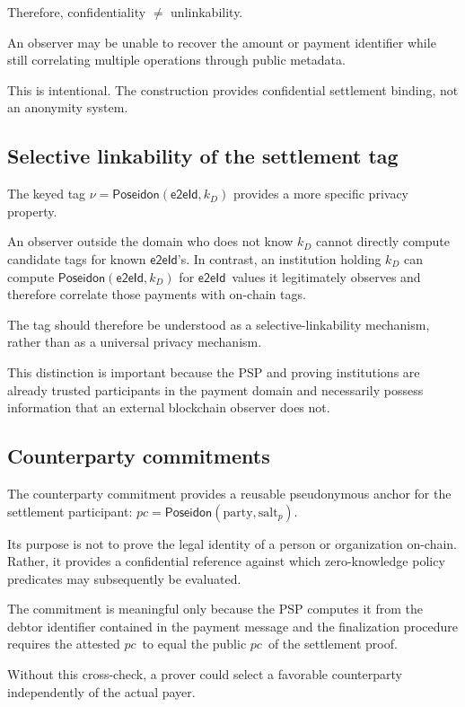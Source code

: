 \documentclass[10pt,twocolumn]{article}
\newcommand{\Poseidon}{\ensuremath{\mathsf{Poseidon}}}
\newcommand{\eeid}{\ensuremath{\mathsf{e2eId}}}
\newcommand{\party}{\ensuremath{\text{party}}}
\newcommand{\salt}{\ensuremath{\text{salt}}}
\newcommand{\pc}{\ensuremath{\mathit{pc}}}
\begin{document}
Therefore, confidentiality $\neq$ unlinkability.

An observer may be unable to recover the amount or payment identifier
while still correlating multiple operations through public metadata.

This is intentional. The construction provides confidential settlement
binding, not an anonymity system.

\subsection{Selective linkability of the settlement tag}

The keyed tag $\nu=\Poseidon(\eeid,k_D)$ provides a more specific privacy
property.

An observer outside the domain who does not know $k_D$ cannot directly
compute candidate tags for known \eeid's. In contrast, an institution
holding $k_D$ can compute $\Poseidon(\eeid,k_D)$ for \eeid\ values it
legitimately observes and therefore correlate those payments with
on-chain tags.

The tag should therefore be understood as a selective-linkability
mechanism, rather than as a universal privacy mechanism.

This distinction is important because the PSP and proving institutions
are already trusted participants in the payment domain and necessarily
possess information that an external blockchain observer does not.

\subsection{Counterparty commitments}

The counterparty commitment provides a reusable pseudonymous anchor for
the settlement participant: $\pc=\Poseidon(\party,\salt_p)$.

Its purpose is not to prove the legal identity of a person or
organization on-chain. Rather, it provides a confidential reference
against which zero-knowledge policy predicates may subsequently be
evaluated.

The commitment is meaningful only because the PSP computes it from the
debtor identifier contained in the payment message and the finalization
procedure requires the attested \pc\ to equal the public \pc\ of the
settlement proof.

Without this cross-check, a prover could select a favorable counterparty
independently of the actual payer.
\end{document}
